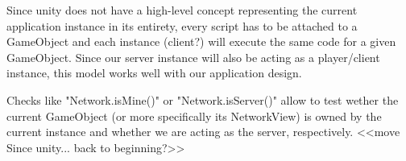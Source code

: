 \documentclass{report}
\begin{document}
Since unity does not have a high-level concept representing the current application instance in its entirety, every script has to be attached to a GameObject and each instance (client?) will execute the same code for a given GameObject. 
Since our server instance will also be acting as a player/client instance, this model works well with our application design.

Checks like "Network.isMine()" or "Network.isServer()" allow to test wether the current GameObject (or more specifically its NetworkView) is owned by the current instance and whether we are acting as the server, respectively. 
<<move Since unity... back to beginning?>>

\begin{figure}
\centering
{}


\end{figure}
\end{document}
